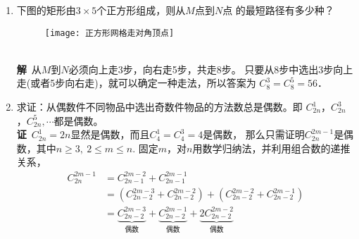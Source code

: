 \begin{enumerate}[label={【\textbf{例\thechapter.\arabic*}】},
 leftmargin=\inteval{\myenumleftmargin}pt,
 itemsep=\inteval{\myenumitempsep}pt,
 itemindent=\inteval{\myenumitemindent}pt]
\item 下图的矩形由$ 3\times 5 $个正方形组成，则从$ M $点到$ N $点
的最短路径有多少种？
\begin{figure}[h]
    \centering
    \texttt{[image: 正方形网格走对角顶点]}
\end{figure} \\
\textbf{解}\ 从$ M $到$ N $必须向上走3步，向右走5步，共走8步。
只要从8步中选出3步向上走(或者5步向右走)，就可以确定一种走法，所以答案为
$ C_8^3=C_8^5=56 $．

\item \label{偶数件物品选奇数件是偶数} 
求证：从偶数件不同物品中选出奇数件物品的方法数总是偶数。即
$ C_{2n}^1 $，$ C_{2n}^3 $，$ C_{2n}^5,\cdots $都是偶数。\\
\textbf{证}\ $ C_{2n}^1=2n $显然是偶数，而且$ C_4^1=C_4^3=4 $是偶数，
那么只需证明$ C_{2n}^{2m-1} $是偶数，其中$ n\geq 3,\ 2\leq m\leq n $. 
固定$ m $，对$ n $用数学归纳法，并利用组合数的递推关系，
\begin{align*}
    C_{2n}^{2m-1} &=C_{2n-1}^{2m-2}+C_{2n-1}^{2m-1} \\
    &=(C_{2n-2}^{2m-3}+C_{2n-2}^{2m-2})+(C_{2n-2}^{2m-2}+C_{2n-2}^{2m-1}) \\
    &=\underbrace{C_{2n-2}^{2m-3}}_{\text{偶数}}+
    \underbrace{C_{2n-2}^{2m-1}}_{\text{偶数}}+
    \underbrace{2C_{2n-2}^{2m-2}}_{\text{偶数}}
\end{align*}


\end{enumerate}
